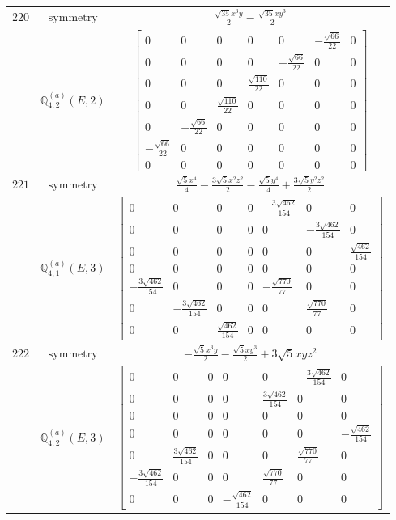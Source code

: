 \documentclass[fleqn,8pt,landscape]{jsarticle}
\begin{document}
\begin{longtable}{ccc}
$ 220 $ & $ \text{symmetry} $ & $ \frac{\sqrt{35} x^{3} y}{2} - \frac{\sqrt{35} x y^{3}}{2} $ \\
$  $ & $ \mathbb{Q}_{4,2}^{(a)}(E,2) $ & $ \begin{bmatrix} 0 & 0 & 0 & 0 & 0 & - \frac{\sqrt{66}}{22} & 0 \\ 0 & 0 & 0 & 0 & - \frac{\sqrt{66}}{22} & 0 & 0 \\ 0 & 0 & 0 & \frac{\sqrt{110}}{22} & 0 & 0 & 0 \\ 0 & 0 & \frac{\sqrt{110}}{22} & 0 & 0 & 0 & 0 \\ 0 & - \frac{\sqrt{66}}{22} & 0 & 0 & 0 & 0 & 0 \\ - \frac{\sqrt{66}}{22} & 0 & 0 & 0 & 0 & 0 & 0 \\ 0 & 0 & 0 & 0 & 0 & 0 & 0 \end{bmatrix} $ \\ \hline
$ 221 $ & $ \text{symmetry} $ & $ \frac{\sqrt{5} x^{4}}{4} - \frac{3 \sqrt{5} x^{2} z^{2}}{2} - \frac{\sqrt{5} y^{4}}{4} + \frac{3 \sqrt{5} y^{2} z^{2}}{2} $ \\
$  $ & $ \mathbb{Q}_{4,1}^{(a)}(E,3) $ & $ \begin{bmatrix} 0 & 0 & 0 & 0 & - \frac{3 \sqrt{462}}{154} & 0 & 0 \\ 0 & 0 & 0 & 0 & 0 & - \frac{3 \sqrt{462}}{154} & 0 \\ 0 & 0 & 0 & 0 & 0 & 0 & \frac{\sqrt{462}}{154} \\ 0 & 0 & 0 & 0 & 0 & 0 & 0 \\ - \frac{3 \sqrt{462}}{154} & 0 & 0 & 0 & - \frac{\sqrt{770}}{77} & 0 & 0 \\ 0 & - \frac{3 \sqrt{462}}{154} & 0 & 0 & 0 & \frac{\sqrt{770}}{77} & 0 \\ 0 & 0 & \frac{\sqrt{462}}{154} & 0 & 0 & 0 & 0 \end{bmatrix} $ \\ \hline
$ 222 $ & $ \text{symmetry} $ & $ - \frac{\sqrt{5} x^{3} y}{2} - \frac{\sqrt{5} x y^{3}}{2} + 3 \sqrt{5} x y z^{2} $ \\
$  $ & $ \mathbb{Q}_{4,2}^{(a)}(E,3) $ & $ \begin{bmatrix} 0 & 0 & 0 & 0 & 0 & - \frac{3 \sqrt{462}}{154} & 0 \\ 0 & 0 & 0 & 0 & \frac{3 \sqrt{462}}{154} & 0 & 0 \\ 0 & 0 & 0 & 0 & 0 & 0 & 0 \\ 0 & 0 & 0 & 0 & 0 & 0 & - \frac{\sqrt{462}}{154} \\ 0 & \frac{3 \sqrt{462}}{154} & 0 & 0 & 0 & \frac{\sqrt{770}}{77} & 0 \\ - \frac{3 \sqrt{462}}{154} & 0 & 0 & 0 & \frac{\sqrt{770}}{77} & 0 & 0 \\ 0 & 0 & 0 & - \frac{\sqrt{462}}{154} & 0 & 0 & 0 \end{bmatrix} $ \\ \hline

\end{longtable}
\end{document}
